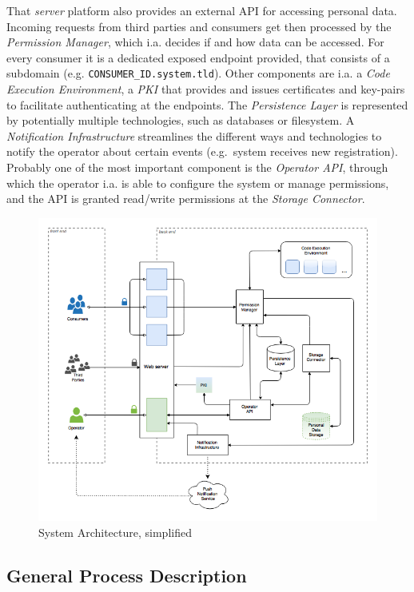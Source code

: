 \documentclass[12pt,english,a4paper,titlepage,cleardoublepage=empty,dottedtoc]{report}
\begin{document}
That \emph{server} platform also provides an external API for accessing
personal data. Incoming requests from third parties and consumers get
then processed by the \emph{Permission Manager}, which i.a. decides if
and how data can be accessed. For every consumer it is a dedicated
exposed endpoint provided, that consists of a subdomain (e.g.
\texttt{CONSUMER\_ID.system.tld}). Other components are i.a. a
\emph{Code Execution Environment}, a \emph{PKI} that provides and issues
certificates and key-pairs to facilitate authenticating at the
endpoints. The \emph{Persistence Layer} is represented by potentially
multiple technologies, such as databases or filesystem. A
\emph{Notification Infrastructure} streamlines the different ways and
technologies to notify the operator about certain events (e.g.~system
receives new registration). Probably one of the most important component
is the \emph{Operator API}, through which the operator i.a. is able to
configure the system or manage permissions, and the API is granted
read/write permissions at the \emph{Storage Connector}.

\begin{figure}
\centering
\includegraphics[width=12.00000cm]{./assets/figures/spec_arch_simplifierd.png}
\caption{System Architecture,
simplified\label{fig:spec_arch_simplifier}}
\end{figure}

\subsection{General Process
Description}\label{general-process-description}
\end{document}
